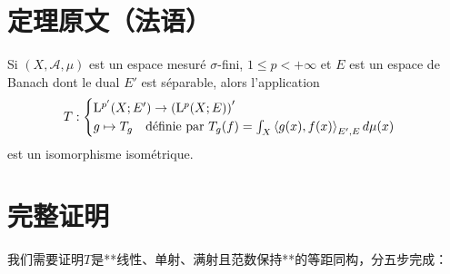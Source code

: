 \section{定理原文（法语）}
\begin{theorem}[Théorème 1.4.1]
Si $(X,\mathcal{A},\mu)$ est un espace mesuré $\sigma$-fini, $1\leq p < +\infty$ et $E$ est un espace de Banach dont le dual $E'$ est séparable, alors l'application
$$
T: \begin{cases}
\mathrm{L}^{p'}(X;E') \to \left( \mathrm{L}^{p}(X;E) \right)' \\
g \mapsto T_g \quad \text{définie par } T_g(f) = \int_X \left\langle g(x), f(x) \right\rangle_{E',E} d\mu(x)
\end{cases}
$$
est un isomorphisme isométrique.
\end{theorem}

\section{完整证明}
我们需要证明$T$是**线性、单射、满射且范数保持**的等距同构，分五步完成：
